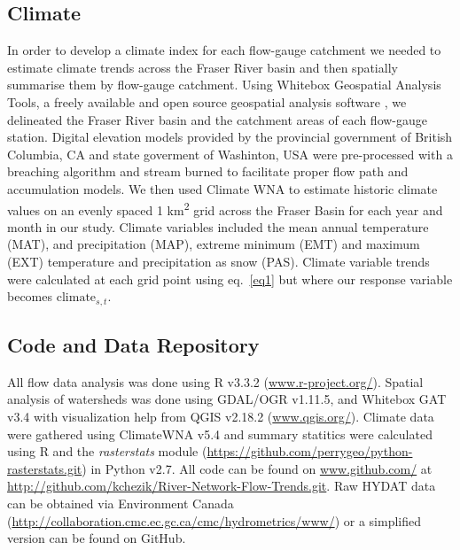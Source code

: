 \documentclass[9pt,twocolumn,twoside,lineno]{pnas-new}
\begin{document}
{\subsection*{Climate} In order to develop a climate index for each flow-gauge catchment we needed to estimate climate trends across the Fraser River basin and then spatially summarise them by flow-gauge catchment. Using Whitebox Geospatial Analysis Tools, a freely available and open source geospatial analysis software \cite{Lindsay:2016}, we delineated the Fraser River basin and the catchment areas of each flow-gauge station. Digital elevation models provided by the provincial government of British Columbia, CA and state goverment of Washinton, USA were pre-processed with a breaching algorithm and stream burned to facilitate proper flow path and accumulation models. We then used Climate WNA to estimate historic climate values on an evenly spaced 1 km\textsuperscript{2} grid across the Fraser Basin for each year and month in our study. Climate variables included the mean annual temperature (MAT), and precipitation (MAP), extreme minimum (EMT) and maximum (EXT) temperature and precipitation as snow (PAS). Climate variable trends were calculated at each grid point using eq.~\ref{eq1} but where our response variable becomes $\mathrm{climate}_{s,t}$.

\subsection*{Code and Data Repository} All flow data analysis was done using R v3.3.2 (\url{www.r-project.org/}). Spatial analysis of watersheds was done using GDAL/OGR v1.11.5, and Whitebox GAT v3.4 \cite{Lindsay:2016} with visualization help from QGIS v2.18.2 (\url{www.qgis.org/}). Climate data were gathered using ClimateWNA v5.4 \cite{Wang:2016} and summary statitics were calculated using R and the \textit{rasterstats} module (\url{https://github.com/perrygeo/python-rasterstats.git}) in Python v2.7. All code can be found on \url{www.github.com/} at \url{http://github.com/kchezik/River-Network-Flow-Trends.git}. Raw HYDAT data can be obtained via Environment Canada (\url{http://collaboration.cmc.ec.gc.ca/cmc/hydrometrics/www/}) or a simplified version can be found on GitHub.
}

\showmatmethods{} %


\showacknow{} %

\pnasbreak


\end{document}
